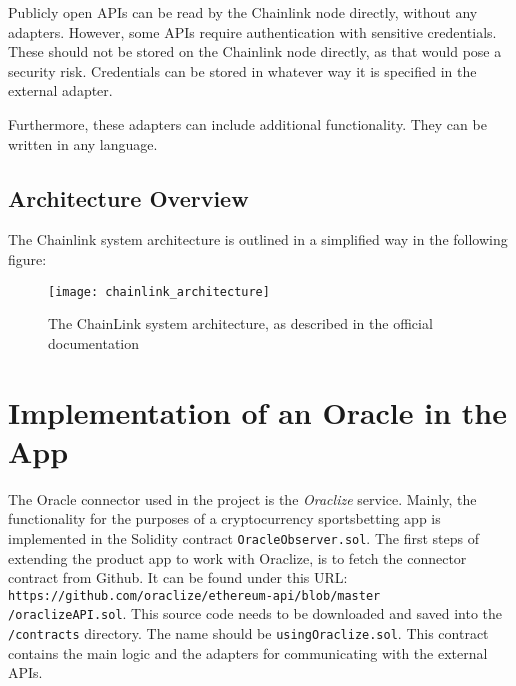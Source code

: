 Publicly open APIs can be read by the Chainlink node directly, without any adapters. However, some APIs require authentication with sensitive credentials. These should not be stored on the Chainlink node directly, as that would pose a security risk. Credentials can be stored in whatever way it is specified in the external adapter.

Furthermore, these adapters can include additional functionality. They can be written in any language\cite{chainlinkdoc}.
\subsection*{Architecture Overview}
The Chainlink system architecture is outlined in a simplified way in the following figure:
\begin{figure}[H]
\centering
\texttt{[image: chainlink\_architecture]}
\caption{The ChainLink system architecture, as described in the official documentation\cite{chainlinkdoc}}
\end{figure}

\section{Implementation of an Oracle in the App}
The Oracle connector used in the project is the \emph{Oraclize} service. Mainly, the functionality for the purposes of a cryptocurrency sportsbetting app is implemented in the Solidity contract \texttt{OracleObserver.sol}.
The first steps of extending the product app to work with Oraclize, is to fetch the connector contract from Github. It can be found under this URL: \texttt{https://github.com/oraclize/ethereum-api/blob/master
\\
/oraclizeAPI.sol}. This source code needs to be downloaded and saved into the \texttt{/contracts} directory. The name should be \texttt{usingOraclize.sol}. This contract contains the main logic and the adapters for communicating with the external APIs.

